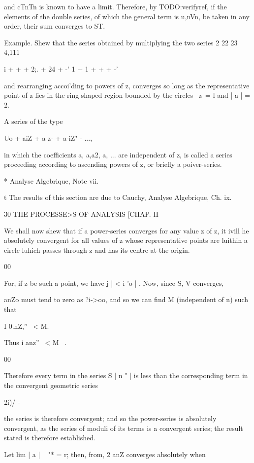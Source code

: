 and cTnTn is known to have a limit. Therefore, by TODO:verifyref, if the
elements of the double series, of which the general term is u,nVn, be
taken in any order, their sum converges to ST.

Example. Shew that the series obtained by multiplying the two series 2
22 23 4,111

i + + + 2;. + 24 + -' 1 + 1 + + + -'

and rearranging accoi'ding to powers of z, converges so long as the
representative point of z lies in the ring-shaped region bounded by
the circles \ z\ = l and | a | = 2.


A series of the type

Uo + aiZ + a z- + a-iZ" - ...,

in which the coefficients a, a,a2, a, ... are independent of z, is
called a series proceeding according to ascending powers of z, or
briefly a poiver-series.

* Analyse Algebrique, Note vii.

t The results of this section are due to Cauchy, Analyse Algebrique,
Ch. ix.

  30 THE PROCESSE>S OF ANALYSIS [CHAP. II

We shall now shew that if a power-series converges for any value z of
z, it ivill he absolutely convergent for all values of z whose
representative points are luithin a circle luhich passes through z and
has its centre at the origin.

00

For, if z be such a point, we have j | < i 'o | . Now, since S, V
converges,

anZo must tend to zero as ?i->oo, and so we can find M (independent
of n) such that

I 0.nZ,'' \ < M.

Thus i anz'' \ < M \ .

00

Therefore every term in the series S | n " | is less than the
corresponding term in the convergent geometric series

2i)/ -

the series is therefore convergent; and so the power-series is
absolutely convergent, as the series of moduli of its terms is a
convergent series; the result stated is therefore established.

Let lim | a | ~ "* = r; then, from, 2 anZ converges absolutely
when


